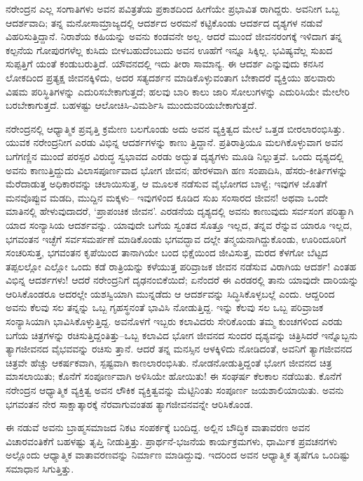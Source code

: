 ನರೇಂದ್ರನ ಎಲ್ಲ ಸಂಗಾತಿಗಳು ಅವನ ಪವಿತ್ರತೆಯ ಪ್ರಕಾಶದಿಂದ ಹೀಗೆಯೇ ಪ್ರಭಾವಿತ ರಾಗಿದ್ದರು. ಅವನೀಗ ಒಬ್ಬ ಆದರ್ಶವಾದಿ; ತನ್ನ ಮನೋಸಾಮ್ರಾಜ್ಯದಲ್ಲಿ ಆದರ್ಶದ ಅರಮನೆ ಕಟ್ಟಿಕೊಂಡು ಆದರ್ಶದ ದೃಶ್ಯಗಳ ನಡುವೆ ವಿಹರಿಸುತ್ತಿದ್ದಾನೆ. ನಿರಾಶೆಯ ಕಹಿಯನ್ನು ಅವನು ಕಂಡವನೇ ಅಲ್ಲ. ಆದರೆ ಮುಂದೆ ಜೀವನರಂಗಕ್ಕೆ ಇಳಿದಾಗ ತನ್ನ ಕಲ್ಪನೆಯ ಗೋಪುರಗಳೆಲ್ಲ ಕುಸಿದು ಬೀಳಬಹುದೆಂಬುದು ಅವನ ಊಹೆಗೆ ಇನ್ನೂ ಸಿಕ್ಕಿಲ್ಲ. ಭವಿಷ್ಯವೆಲ್ಲ ಸುಖದ ಸುಪ್ಪತ್ತಿಗೆ ಯಂತೆ ಕಂಡುಬರುತ್ತಿದೆ. ಯೌವನದಲ್ಲಿ ಇದು ತೀರಾ ಸಾಮಾನ್ಯ. ಈ ಆದರ್ಶ ಎನ್ನುವುದು ಕನಸಿನ ಲೋಕದಿಂದ ಪ್ರತ್ಯಕ್ಷ ಜೀವನಕ್ಕಿಳಿದು, ಅದರ ಸತ್ಯದರ್ಶನ ಮಾಡಿಕೊಳ್ಳುವಂತಾಗ ಬೇಕಾದರೆ ವ್ಯಕ್ತಿಯು ಹಲವಾರು ವಿಷಮ ಪರಿಸ್ಥಿತಿಗಳನ್ನು ಎದುರಿಸಬೇಕಾಗುತ್ತದೆ; ಹಲವು ಬಾರಿ ಕಾಲು ಜಾರಿ ಸೋಲುಗಳನ್ನು ಎದುರಿಸಿಯೇ ಮೇಲೇರಿ ಬರಬೇಕಾಗುತ್ತದೆ. ಬಹಳಷ್ಟು ಆಲೋಚಿಸಿ-ವಿಮರ್ಶಿಸಿ ಮುಂದುವರಿಯಬೇಕಾಗುತ್ತದೆ.

ನರೇಂದ್ರನಲ್ಲಿ ಆಧ್ಯಾತ್ಮಿಕ ಪ್ರವೃತ್ತಿ ಕ್ರಮೇಣ ಬಲಗೊಂಡು ಅದು ಅವನ ವ್ಯಕ್ತಿತ್ವದ ಮೇಲೆ ಒತ್ತಡ ಬೀರಲಾರಂಭಿಸಿತ್ತು. ಯುವಕ ನರೇಂದ್ರನೀಗ ಎರಡು ವಿಭಿನ್ನ ಆದರ್ಶಗಳನ್ನು ಕಾಣು ತ್ತಿದ್ದಾನೆ. ಪ್ರತಿರಾತ್ರಿಯೂ ಮಲಗಿಕೊಳ್ಳುವಾಗ ಅವನ ಬಗೆಗಣ್ಣಿನ ಮುಂದೆ ಪರಸ್ಪರ ವಿರುದ್ಧ ಸ್ವಭಾವದ ಎರಡು ಅದ್ಭುತ ದೃಶ್ಯಗಳು ಮೂಡಿ ನಿಲ್ಲುತ್ತವೆ. ಒಂದು ದೃಶ್ಯದಲ್ಲಿ ಅವನು ಕಾಣುತ್ತಿದ್ದುದು ವಿಲಾಸಪೂರ್ಣವಾದ ಭೋಗ ಜೀವನ; ಹೇರಳವಾಗಿ ಹಣ ಸಂಪಾದಿಸಿ, ಹೆಸರು-ಕೀರ್ತಿಗಳನ್ನು ಮೆರೆದಾಡುತ್ತ ಅಧಿಕಾರವನ್ನು ಚಲಾಯಿಸುತ್ತ, ಆ ಮೂಲಕ ನಡೆಸುವ ವೈಭೋಗದ ಬಾಳ್ವೆ; ಇವುಗಳ ಜೊತೆಗೆ ಮನವೊಪ್ಪುವ ಮಡದಿ, ಮುದ್ದಿನ ಮಕ್ಕಳು– ಇವುಗಳಿಂದ ಕೂಡಿದ ಸುಖ ಸಂಸಾರದ ಜೀವನ! ಅಥವಾ ಒಂದೇ ಮಾತಿನಲ್ಲಿ ಹೇಳುವುದಾದರೆ, ‘ಪ್ರಾಪಂಚಿಕ ಜೀವನ’. ಎರಡನೆಯ ದೃಶ್ಯದಲ್ಲಿ ಅವನು ಕಾಣುವುದು ಸರ್ವಸಂಗ ಪರಿತ್ಯಾಗಿ ಯಾದ ಸಂನ್ಯಾಸಿಯ ಆದರ್ಶವನ್ನು. ಯಾವುದೇ ಬಗೆಯ ಸ್ವಂತದ ಸೊತ್ತೂ ಇಲ್ಲದ, ತನ್ನವ ರೆನ್ನುವ ಯಾರೂ ಇಲ್ಲದ, ಭಗವಂತನ ಇಚ್ಛೆಗೆ ಸರ್ವಸಮರ್ಪಣೆ ಮಾಡಿಕೊಂಡು ಭಗವದ್ಭಾವ ದಲ್ಲೇ ತನ್ಮಯನಾಗಿದ್ದುಕೊಂಡು, ಊರಿಂದೂರಿಗೆ ಸಂಚರಿಸುತ್ತ, ಭಗವಂತನ ಕೃಪೆಯಿಂದ ತಾನಾಗಿಯೇ ಬಂದ ಭಿಕ್ಷೆಯಿಂದ ಜೀವಿಸುತ್ತ, ಮರದ ಕೆಳಗೋ ಬೆಟ್ಟದ ತಪ್ಪಲಲ್ಲೋ ಎಲ್ಲೋ ಒಂದು ಕಡೆ ರಾತ್ರಿಯನ್ನು ಕಳೆಯುತ್ತ ಪರಿವ್ರಾಜಕ ಜೀವನ ನಡೆಸುವ ವಿರಾಗಿಯ ಆದರ್ಶ! ಎಂತಹ ವಿಭಿನ್ನ ಆದರ್ಶಗಳು! ಆದರೆ ನರೇಂದ್ರನಿಗೆ ದೃಢನಂಬಿಕೆಯಿದೆ; ಏನೆಂದರೆ ಈ ಎರಡರಲ್ಲಿ ತಾನು ಯಾವುದೇ ದಾರಿಯನ್ನು ಆರಿಸಿಕೊಂಡರೂ ಅದರಲ್ಲೇ ಯಶಸ್ವಿಯಾಗಿ ಮುನ್ನಡೆದು ಆ ಆದರ್ಶವನ್ನು ಸಿದ್ಧಿಸಿಕೊಳ್ಳಬಲ್ಲೆ ಎಂದು. ಆದ್ದರಿಂದ ಅವನು ಕೆಲವು ಸಲ ತನ್ನನ್ನು ಒಬ್ಬ ಗೃಹಸ್ಥನಂತೆ ಭಾವಿಸಿ ನೋಡುತ್ತಿದ್ದ. ಇನ್ನು ಕೆಲವು ಸಲ ಒಬ್ಬ ಪರಿವ್ರಾಜಕ ಸಂನ್ಯಾಸಿಯಾಗಿ ಭಾವಿಸಿಕೊಳ್ಳುತ್ತಿದ್ದ. ಅವನೊಳಗೆ ಇಬ್ಬರು ಕಲಾವಿದರು ಸೇರಿಕೊಂಡು ತಮ್ಮ ಕುಂಚಗಳಿಂದ ಎರಡು ಬಗೆಯ ಚಿತ್ರಗಳನ್ನು ರಚಿಸುತ್ತಿದ್ದಂತಿತ್ತು–ಒಬ್ಬ ಕಲಾವಿದ ಭೋಗ ಜೀವನದ ಸುಂದರ ದೃಶ್ಯವನ್ನು ಚಿತ್ರಿಸಿದರೆ ಇನ್ನೊಬ್ಬನು ತ್ಯಾಗಜೀವನದ ವೈಭವವನ್ನು ರಚಿಸು ತ್ತಾನೆ. ಆದರೆ ತನ್ನ ಮನಸ್ಸಿನ ಆಳಕ್ಕಿಳಿದು ನೋಡಿದಂತೆ, ಅವನಿಗೆ ತ್ಯಾಗಜೀವನದ ಚಿತ್ರವೇ ಹೆಚ್ಚು ಆಕರ್ಷಕವಾಗಿ, ಸ್ಪಷ್ಟವಾಗಿ ಕಾಣಲಾರಂಭಿಸಿತು. ನೋಡನೋಡುತ್ತಿದ್ದಂತೆ ಭೋಗ ಜೀವನದ ಚಿತ್ರ ಮಾಸಲಾಯಿತು; ಕೊನೆಗೆ ಸಂಪೂರ್ಣವಾಗಿ ಅಳಿಸಿಯೇ ಹೋಯಿತು! ಈ ಸಂಘರ್ಷ ಕೆಲಕಾಲ ನಡೆಯಿತು. ಕೊನೆಗೆ ನರೇಂದ್ರನ ಆಧ್ಯಾತ್ಮಿಕ ವ್ಯಕ್ತಿತ್ವ ಅವನ ಲೌಕಿಕ ವ್ಯಕ್ತಿತ್ವವನ್ನು ಮೆಟ್ಟಿನಿಂತು ಸಂಪೂರ್ಣ ಜಯಶಾಲಿಯಾಯಿತು. ಅವನು ಭಗವಂತನ ನೇರ ಸಾಕ್ಷಾತ್ಕಾರಕ್ಕೆ ನೆರವಾಗುವಂತಹ ತ್ಯಾಗಜೀವನವನ್ನೇ ಆರಿಸಿಕೊಂಡ.

ಈ ನಡುವೆ ಅವನು ಬ್ರಾಹ್ಮಸಮಾಜದ ನಿಕಟ ಸಂಪರ್ಕಕ್ಕೆ ಬಂದಿದ್ದ. ಅಲ್ಲಿನ ಬೌದ್ಧಿಕ ವಾತಾವರಣ ಅವನ ವಿಚಾರವಂತಿಕೆಗೆ ಬಹಳಷ್ಟು ತೃಪ್ತಿ ನೀಡುತ್ತಿತ್ತು. ಪ್ರಾರ್ಥನೆ-ಭಜನೆಯ ಕಾರ್ಯಕ್ರಮಗಳು, ಧಾರ್ಮಿಕ ಪ್ರವಚನಗಳು ಅಲ್ಲೊಂದು ಆಧ್ಯಾತ್ಮಿಕ ವಾತಾವರಣವನ್ನು ನಿರ್ಮಾಣ ಮಾಡಿದ್ದುವು. ಇದರಿಂದ ಅವನ ಆಧ್ಯಾತ್ಮಿಕ ತೃಷೆಗೂ ಒಂದಿಷ್ಟು ಸಮಾಧಾನ ಸಿಗುತ್ತಿತ್ತು.

